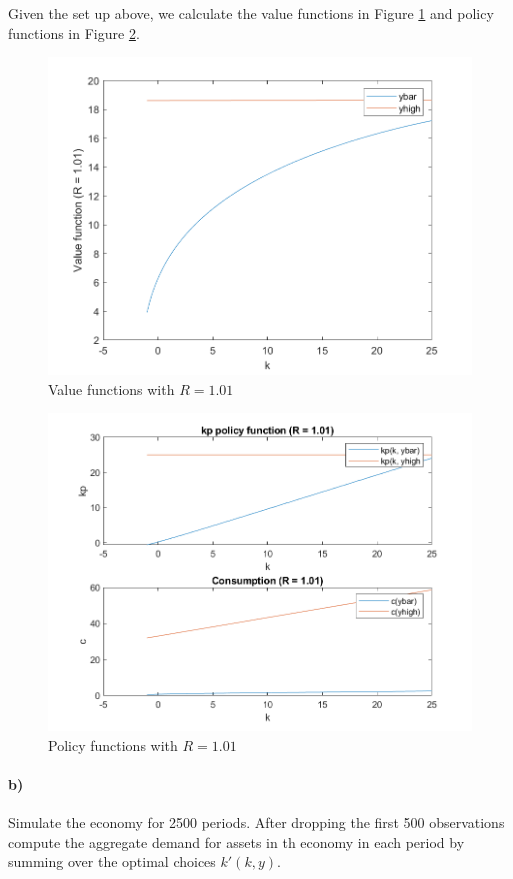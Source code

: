 \documentclass[12pt,letter]{article}
\begin{document}
Given the set up above, we calculate the value functions in Figure \ref{fig:value_functions} and policy functions in Figure \ref{fig:policy_functions}.
\begin{figure}[H]
	\centering
	\includegraphics[scale=0.75]{value_functions_gridpoints501.png}
	\caption{Value functions with $R = 1.01$}
	\label{fig:value_functions}
\end{figure}
\begin{figure}[H]
	\centering
	\includegraphics[scale=0.75]{c_and_k_gridpoints501.png}
	\caption{Policy functions with $R=1.01$}
	\label{fig:policy_functions}
\end{figure}
\paragraph{b)} Simulate the economy for 2500 periods. After dropping the first 500 observations compute the aggregate demand for assets in th economy in each period by summing over the optimal choices $k'(k, y)$. \\
\end{document}
